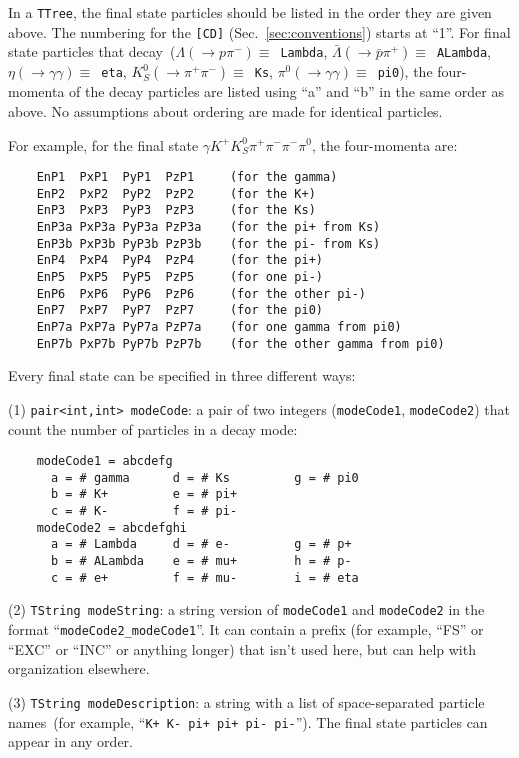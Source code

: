 \documentclass[11pt]{article}
\begin{document}
In a {\tt TTree}, the final state particles should be listed in the order they are given above.  The numbering for the {\tt [CD]} (Sec.~\ref{sec:conventions}) starts at ``1''.  For final state particles that decay~($\Lambda (\to p \pi^-) \equiv $~{\tt Lambda}, 
$\bar{\Lambda} (\to \bar{p} \pi^+) \equiv $~{\tt ALambda}, $\eta (\to \gamma\gamma) \equiv $~{\tt eta}, $K^0_S (\to \pi^+\pi^-) \equiv $~{\tt Ks}, $\pi^0 (\to \gamma\gamma) \equiv $~{\tt pi0}), the four-momenta of the decay particles are listed using ``a'' and ``b'' in the same order as above.  No assumptions about ordering are made for identical particles.

For example, for the final state $\gamma K^+ K^0_S \pi^+ \pi^- \pi^- \pi^0$, the four-momenta are:
\begin{verbatim}
    EnP1  PxP1  PyP1  PzP1     (for the gamma)
    EnP2  PxP2  PyP2  PzP2     (for the K+)
    EnP3  PxP3  PyP3  PzP3     (for the Ks)
    EnP3a PxP3a PyP3a PzP3a    (for the pi+ from Ks)
    EnP3b PxP3b PyP3b PzP3b    (for the pi- from Ks)
    EnP4  PxP4  PyP4  PzP4     (for the pi+)
    EnP5  PxP5  PyP5  PzP5     (for one pi-)
    EnP6  PxP6  PyP6  PzP6     (for the other pi-)
    EnP7  PxP7  PyP7  PzP7     (for the pi0)
    EnP7a PxP7a PyP7a PzP7a    (for one gamma from pi0)
    EnP7b PxP7b PyP7b PzP7b    (for the other gamma from pi0)
\end{verbatim}





Every final state can be specified in three different ways:

(1) {\tt pair<int,int> modeCode}: a pair of two integers ({\tt modeCode1}, {\tt modeCode2}) that count the number of particles in a decay mode:
\begin{verbatim}
    modeCode1 = abcdefg
      a = # gamma      d = # Ks         g = # pi0
      b = # K+         e = # pi+
      c = # K-         f = # pi-
    modeCode2 = abcdefghi
      a = # Lambda     d = # e-         g = # p+
      b = # ALambda    e = # mu+        h = # p-
      c = # e+         f = # mu-        i = # eta
\end{verbatim}
(2) {\tt TString modeString}: a string version of {\tt modeCode1} and {\tt modeCode2} in the format ``{\tt modeCode2\_modeCode1}''.  It can contain a prefix (for example, ``FS'' or ``EXC'' or ``INC'' or anything longer) that isn't used here, but can help with organization elsewhere.  

(3) {\tt TString modeDescription}: a string with a list of space-separated particle names~(for example, ``{\tt K+ K- pi+ pi+ pi- pi-}'').  The final state particles can appear in any order. 
\end{document}
